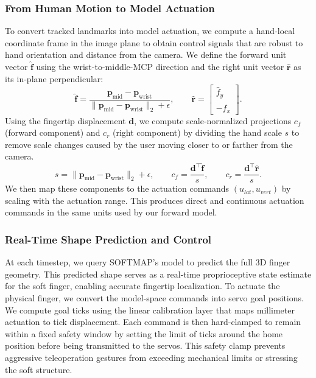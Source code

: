 \documentclass[letterpaper, 10 pt, conference]{ieeeconf}  %
\newcommand{\algname}{SOFTMAP\xspace}
\begin{document}
\subsubsection{From Human Motion to Model Actuation}
To convert tracked landmarks into model actuation, we compute a hand-local coordinate frame in the image plane to obtain control signals that are robust to hand orientation and distance from the camera. We define the forward unit vector $\hat{\mathbf{f}}$ using the wrist-to-middle-MCP direction and the right unit vector $\hat{\mathbf{r}}$ as its in-plane perpendicular:
\begin{equation}
\hat{\mathbf{f}}=
\frac{\mathbf{p}_{\mathrm{mid}}-\mathbf{p}_{\mathrm{wrist}}}{\|\mathbf{p}_{\mathrm{mid}}-\mathbf{p}_{\mathrm{wrist}}\|_2+\epsilon},
\qquad
\hat{\mathbf{r}}=
\begin{bmatrix}
\hat{f}_y\\
-\hat{f}_x
\end{bmatrix}.
\label{eq:hand_frame}
\end{equation}
Using the fingertip displacement $\mathbf{d}$, we compute scale-normalized projections $c_f$ (forward component) and $c_r$ (right component) by dividing the hand scale $s$ to remove scale changes caused by the user moving closer to or farther from the camera.
\begin{equation}
s=\|\mathbf{p}_{\mathrm{mid}}-\mathbf{p}_{\mathrm{wrist}}\|_2+\epsilon,
\qquad
c_f=\frac{\mathbf{d}^\top \hat{\mathbf{f}}}{s},
\qquad
c_r=\frac{\mathbf{d}^\top \hat{\mathbf{r}}}{s}.
\label{eq:proj}
\end{equation}
We then map these components to the actuation commands $(u_{lat}, u_{vert})$ by scaling with the actuation range. This produces direct and continuous actuation commands in the same units used by our forward model.

\subsubsection{Real-Time Shape Prediction and Control}
At each timestep, we query \algname's model to predict the full 3D finger geometry. This predicted shape serves as a real-time proprioceptive state estimate for the soft finger, enabling accurate fingertip localization. To actuate the physical finger, we convert the model-space commands into servo goal positions. We compute goal ticks using the linear calibration layer that maps millimeter actuation to tick displacement. Each command is then hard-clamped to remain within a fixed safety window by setting the limit of ticks around the home position before being transmitted to the servos. This safety clamp prevents aggressive teleoperation gestures from exceeding mechanical limits or stressing the soft structure.
\end{document}

